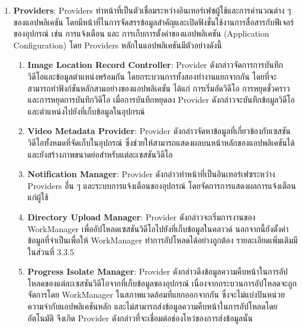 \begin{enumerate}
    \item \textbf{Providers}: Providers ทำหน้าที่เป็นตัวเชื่อมระหว่างอินเทอร์เฟซผู้ใช้และการคำนวณต่าง ๆ ของแอปพลิเคชัน โดยมีหน้าที่ในการจัดสรรข้อมูลสำคัญและเปิดฟังชั่นใช้งานการสื่อสารกับฟีเจอร์ของอุปกรณ์ เช่น การแจ้งเตือน และ การเก็บการตั้งค่าของแอปพลิเคชัน (Application Configuration) โดย Providers หลักในแอปพลิเคชันมีตัวอย่างดังนี้
    \begin{enumerate}
        \item \textbf{Image Location Record Controller}: Provider ดังกล่าวจัดการการบันทึกวิดีโอและข้อมูลตำแหน่งพร้อมกัน โดยกระบวนการทั้งสองทำงานแยกจากกัน โดยที่จะสามารถทำฟังก์ชันหลักสามอย่างของแอปพลิเคชัน ได้แก่ การเริ่มอัดวิดีโอ การหยุดชั่วคราว และการหยุดการบันทึกวิดีโอ เมื่อการบันทึกหยุดลง Provider ดังกล่าวจะบันทึกข้อมูลวิดีโอและตำแหน่งไปยังที่เก็บข้อมูลในอุปกรณ์
        \item \textbf{Video Metadata Provider}: Provider ดังกล่าวจัดหาข้อมูลที่เกี่ยวข้องกับเซสชันวิดีโอทั้งหมดที่จัดเก็บในอุปกรณ์ ซึ่งช่วยให้สามารถแสดงผลบนหน้าหลักของแอปพลิเคชันได้ และยังสร้างภาพขนาดย่อสำหรับแต่ละเซสชันวิดีโอ  
        \item \textbf{Notification Manager}: Provider ดังกล่าวทำหน้าที่เป็นอินเทอร์เฟซระหว่าง Providers อื่น ๆ และระบบการแจ้งเตือนของอุปกรณ์ โดยจัดการการแสดงผลการแจ้งเตือนแก่ผู้ใช้  
        \item \textbf{Directory Upload Manager}: Provider ดังกล่าวจะเริ่มการงานของ WorkManager เพื่ออัปโหลดเซสชันวิดีโอไปยังที่เก็บข้อมูลในคลาวด์ นอกจากนี้ยังตั้งค่าข้อมูลที่จำเป็นเพื่อให้ WorkManager ทำการอัปโหลดได้อย่างถูกต้อง รายละเอียดเพิ่มเติมมีในส่วนที่ 3.3.5 %
        \item \textbf{Progress Isolate Manager}: Provider ดังกล่าวดึงข้อมูลความคืบหน้าในการอัปโหลดของแต่ละเซสชันวิดีโอจากที่เก็บข้อมูลของอุปกรณ์ เนื่องจากกระบวนการอัปโหลดจะถูกจัดการโดย WorkManager ในสภาพแวดล้อมที่แยกออกจากกัน ซึ่งจะไม่แบ่งปันหน่วยความจำกับแอปพลิเคชันหลัก และไม่สามารถส่งข้อมูลความคืบหน้าในการอัปโหลดโดยอัตโนมัติ จึงเกิด Provider ดังกล่าวที่จะเชื่อมต่อช่องโหว่ของการส่งข้อมูลนั้น
    \end{enumerate}
    

\end{enumerate}
